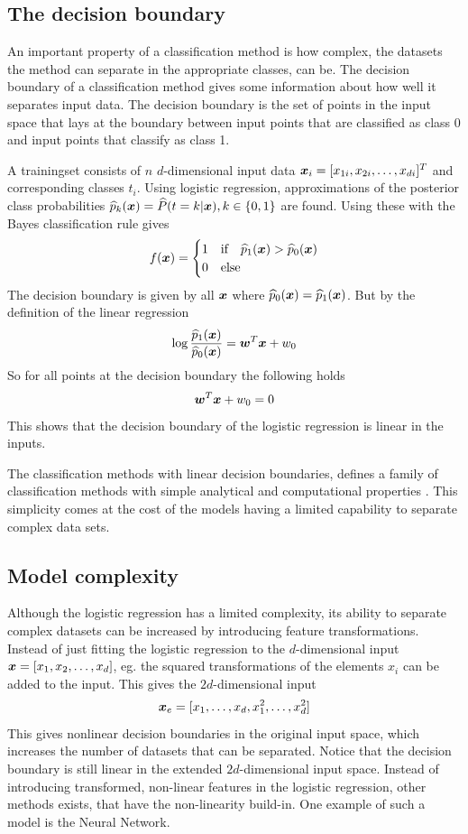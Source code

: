 \subsection{The decision boundary}
An important property of a classification method is how complex, the datasets the method can separate in the appropriate classes, can be. The decision boundary of a classification method gives some information about how well it separates input data. The decision boundary is the set of points in the input space that lays at the boundary between input points that are classified as class 0 and input points that classify as class 1.
\begin{Exa}
    A trainingset consists of $n$ $d$-dimensional input data $\boldsymbol{x}_i=[x_{1i}, x_{2i}, \dots, x_{di}]^T$ and corresponding classes $t_i$. Using logistic regression, approximations of the posterior class probabilities $\widehat{p}_k(\boldsymbol{x})=\widehat{P}(t=k|\boldsymbol{x}), k\in\{0,1\}$ are found. Using these with the Bayes classification rule gives
    \[
        f(\boldsymbol{x}) = \begin{cases}
            1 & \text{if}\quad \widehat{p}_1(\boldsymbol{x})>\widehat{p}_0(\boldsymbol{x}) \\
            0 & \text{else}
        \end{cases}
    \]
    The decision boundary is given by all $\boldsymbol{x}$ where $\widehat{p}_0(\boldsymbol{x})=\widehat{p}_1(\boldsymbol{x})$. But by the definition of the linear regression
    \[
        \log\frac{\widehat{p}_1(\boldsymbol{x})}{\widehat{p}_0(\boldsymbol{x})} = \boldsymbol{w}^T\boldsymbol{x}+w_0
    \]
    So for all points at the decision boundary the following holds
    \[
        \boldsymbol{w}^T\boldsymbol{x}+w_0 = 0
    \]
    This shows that the decision boundary of the logistic regression is linear in the inputs.
\end{Exa}
The classification methods with linear decision boundaries, defines a family of classification methods with simple analytical and computational properties \citep[p.179]{bishop}. This simplicity comes at the cost of the models having a limited capability to separate complex data sets. 

\subsection{Model complexity}\label{sec:logistic-complexity}
Although the logistic regression has a limited complexity, its ability to separate complex datasets can be increased by introducing feature transformations. Instead of just fitting the logistic regression to the $d$-dimensional input $\boldsymbol{x}=[x_1, x_2, \dots, x_d]$, eg. the squared transformations of the elements $x_i$ can be added to the input. This gives the $2d$-dimensional input 
\[
    \boldsymbol{x}_e = [x_1, \dots, x_d, x_1^2, \dots, x_d^2]
\]
This gives nonlinear decision boundaries in the original input space, which increases the number of datasets that can be separated. Notice that the decision boundary is still linear in the extended $2d$-dimensional input space. Instead of introducing transformed, non-linear features in the logistic regression, other methods exists, that have the non-linearity build-in. One example of such a model is the Neural Network.


